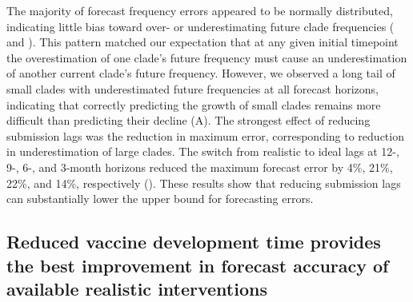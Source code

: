 \documentclass[9pt,lineno]{elife}
\begin{document}
The majority of forecast frequency errors appeared to be normally distributed, indicating little bias toward over- or underestimating future clade frequencies ( and ).
This pattern matched our expectation that at any given initial timepoint the overestimation of one clade's future frequency must cause an underestimation of another current clade's future frequency.
However, we observed a long tail of small clades with underestimated future frequencies at all forecast horizons, indicating that correctly predicting the growth of small clades remains more difficult than predicting their decline (A).
The strongest effect of reducing submission lags was the reduction in maximum error, corresponding to reduction in underestimation of large clades.
The switch from realistic to ideal lags at 12-, 9-, 6-, and 3-month horizons reduced the maximum forecast error by 4\%, 21\%, 22\%, and 14\%, respectively ().
These results show that reducing submission lags can substantially lower the upper bound for forecasting errors.

\subsection{Reduced vaccine development time provides the best improvement in forecast accuracy of available realistic interventions}
\end{document}
